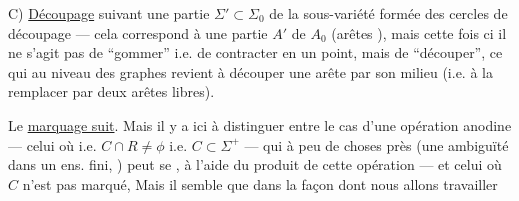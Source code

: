 C) \uline{Découpage}  suivant une partie 
$\Sigma'\subset\Sigma_0$ de la sous-variété formée des cercles de découpage --- cela correspond à une partie $A'$ de $A_0$ (arêtes  ), mais cette fois ci il ne s'agit pas de ``gommer'' i.e. de contracter en un point, mais de ``découper'', ce qui au niveau des graphes revient à découper une arête par son milieu (i.e. à la remplacer par deux arêtes libres).

Le \uline{marquage suit}. 
Mais il y a ici à distinguer entre le cas d'une opération anodine  --- celui
où 
 i.e. $C\cap R\ne\phi$ i.e. $C\subset\Sigma^+$ --- qui à peu de choses près (une ambiguïté dans un ens. fini, \deleted{)} ) peut se , à l'aide du produit de cette opération --- et celui où $C$ n'est pas marqué,
Mais il semble que dans la façon dont nous allons travailler
